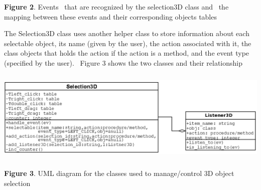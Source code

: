 \documentclass[letterpaper]{article}
\begin{document}
\bigskip


\bigskip


\bigskip


\bigskip


\bigskip


\bigskip


\bigskip


\bigskip


\bigskip



\begin{center}
\begin{minipage}{5.1264in}
{
\textbf{Figure 2}. Events \ that are recognized by the selection3D class and \ the mapping between these events and
their corresponding objects tables}
\end{minipage}
\end{center}

\bigskip


\bigskip


\bigskip

{
The \textsf{Selection3D} class uses another helper class to store information about each selectable object, its name
(given by the user), the action associated with it, the class objects that holds the action if the action is a method,
and the event type (specified by the user). \ Figure 3 shows the two classes and their relationship}


\bigskip



\begin{center}
\includegraphics[width=6in,height=1.75in]{utr9/utr9-img035.png}
\end{center}
\begin{center}
\begin{minipage}{5.1264in}
{
\textbf{Figure 3}. UML diagram for the classes used to manage/control 3D object selection}
\end{minipage}
\end{center}
\end{document}
